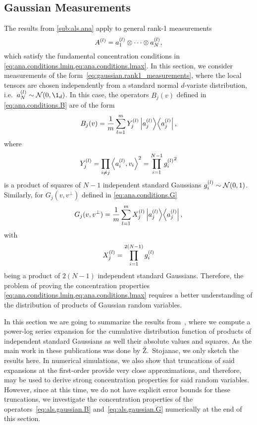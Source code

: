 \subsection{Gaussian Measurements}%
\label{sub:als.gaussian_measurements}

The results from \cref{sub:als.ana} apply to general rank-1 measurements
\[
  A^{(l)} = a^{(l)}_1 \otimes \cdots \otimes a^{(l)}_N,
  \label{eq:gaussian.rank1_measurements}
\]
which satisfy the fundamental concentration conditions in \cref{eq:ana.conditions.lmin,eq:ana.conditions.lmax}.
In this section, we consider measurements of the form~\eqref{eq:gaussian.rank1_measurements}, where the local tensors are chosen independently from a standard normal $d$-variate distribution, i.e.\ $a\ind{l}_N \sim \Normal(0, \1_d)$.
In this case, the operators $B_j(v)$ defined in \cref{eq:ana.conditions.B} are of the form
\[
  \label{eq:als.gaussian.B}
  B_j(v) = \frac{1}{m} \sum_{l=1}^m Y_j^{(l)} \left| a^{(l)}_j \middle\rangle\middle\langle a^{(l)}_j \right|,
\]
where
\[
  Y_j^{(l)} = \prod_{i \neq j} \Braket{a_i^{(l)}, v_i}^2 = \prod_{i = 1}^{N - 1} {g^{(l)}_i}^2
\]
is a product of squares of $N - 1$ independent standard Gaussians $g^{(l)}_i \sim \mathcal{N}(0, 1)$.
Similarly, for $G_j(v, v^\perp)$ defined in \cref{eq:ana.conditions.G}
\[
  \label{eq:als.gaussian.G}
  G_j(v, v^\perp) = \frac{1}{m} \sum_{l=1}^m X_j^{(l)} \left| a^{(l)}_j \middle\rangle\middle\langle a^{(l)}_j \right|,
\]
with
\[
  X_j^{(l)} = \prod_{i = 1}^{2(N - 1)} {g^{(l)}_i}
\]
being a product of $2(N - 1)$ independent standard Gaussians.
Therefore, the problem of proving the concentration properties \cref{eq:ana.conditions.lmin,eq:ana.conditions.lmax} requires a better understanding of the distribution of products of Gaussian random variables.

In this section we are going to summarize the results from~\cite{Stojanac,Stojanac}, where we compute a power-log series expansion for the cumulative distribution function of products of independent standard Gaussians as well their absolute values and squares.
As the main work in these publications was done by Ž.\ Stojanac, we only sketch the results here.
In numerical simulations, we also show that truncations of said expansions at the first-order provide very close approximations, and therefore, may be used to derive strong concentration properties for said random variables.
However, since at this time, we do not have explicit error bounds for these truncations, we investigate the concentration properties of the operators~\eqref{eq:als.gaussian.B} and~\eqref{eq:als.gaussian.G} numerically at the end of this section.\\



